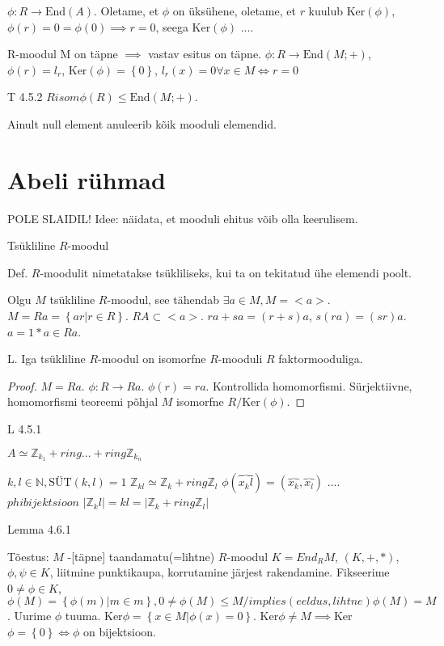 \documentclass[12pt]{report}
\numberwithin{equation}{section}
\theoremstyle{definition}
\theoremstyle{plain}
\begin{document}
$\phi: R \to \text{End}(A)$. Oletame, et $\phi$ on \"uks\"uhene, oletame, et $r$ kuulub Ker$(\phi)$, $\phi(r) = 0 = \phi(0) \implies r=0$, seega Ker$(\phi)$  ....

R-moodul M on täpne $\implies$ vastav esitus on täpne. $\phi : R \to \text{End}(M;+)$, $\phi(r) = l_r$, Ker$(\phi) = \left\{ 0 \right\}$, $l_r(x) = 0 \forall x \in M \iff r=0$

T 4.5.2
$R isom \phi(R) \leq \text{End} \left( M;+ \right)$.

Ainult null element anuleerib kõik mooduli elemendid. 

\section{Abeli r\"uhmad}
POLE SLAIDIL! 
Idee: näidata, et mooduli ehitus võib olla keerulisem. 

Tsükliline $R$-moodul 

Def. $R$-moodulit nimetatakse ts\"ukliliseks, kui ta on tekitatud \"uhe elemendi poolt. 

Olgu $M$ ts\"ukliline $R$-moodul, see tähendab $\exists a \in M, M = < a >$. $M = Ra = \left\{ ar | r \in R \right\}$. $RA \subset < a > $. $ra + sa = (r + s) a$, $s(ra) = (sr)a$. $a = 1 * a \in Ra$. 

L. Iga ts\"ukliline $R$-moodul on isomorfne $R$-mooduli $R$ faktormooduliga. 

\begin{proof}
$M = Ra$.
$\phi: R \to Ra$.
$\phi(r) = ra$.
Kontrollida homomorfismi. S\"urjektiivne, homomorfismi teoreemi põhjal $M$ isomorfne $R/ \text{Ker} \left( \phi \right)$.

\end{proof}



L 4.5.1


$A \simeq \mathbb{Z}_{k_1} +ring ... +ring \mathbb{Z}_{k_n}$

$k,l \in \mathbb{N}, \text{S\"UT}(k,l)=1$
$\mathbb{Z}_{kl} \simeq \mathbb{Z}_k +ring \mathbb{Z}_l$
$\phi(\overbrace{x_kl}) = (\overbrace{x_k},\overbrace{x_l})$
....
$phi bijektsioon$ 
$|\mathbb{Z}_kl| = kl = |\mathbb{Z}_k +ring \mathbb{Z}_l|$

Lemma 4.6.1

Tõestus:
$M$ -[täpne] taandamatu(=lihtne) $R$-moodul
$ K = End_{R}M $, $(K,+,*)$, $ \phi,\psi \in K $, liitmine punktikaupa, korrutamine järjest rakendamine. 
Fikseerime $0 \neq \phi \in K$, $\phi(M) = \left\{ \phi(m) | m \in m \right\}, {0} \neq \phi(M) \leq M /implies (eeldus, lihtne) \phi(M) = M$. Uurime $\phi$ tuuma. Ker$\phi = \left\{x \in M | \phi(x) = 0 \right\}$. Ker$\phi \neq M \implies $Ker$\phi = \left\{ 0 \right\} \iff \phi $ on bijektsioon.
\end{document}
